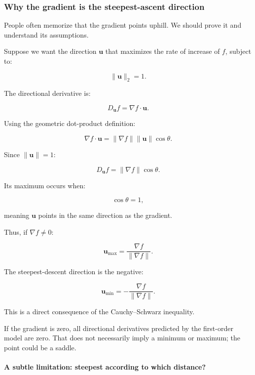 \subsubsection{Why the gradient is the steepest-ascent direction}\label{02-foundations-ii-ch021-why-the-gradient-is-the-steepest-ascent-direction}

\hypertarget{02-foundations-ii-ch021-why-the-gradient-is-the-steepest-ascent-direction}{}

People often memorize that the gradient points uphill. We should prove it and understand its assumptions.

Suppose we want the direction \(\mathbf u\) that maximizes the rate of increase of \(f\), subject to:

\[
\|\mathbf u\|_2=1.
\]

The directional derivative is:

\[
D_{\mathbf u}f=\nabla f\cdot\mathbf u.
\]

Using the geometric dot-product definition:

\[
\nabla f\cdot\mathbf u = \|\nabla f\|\|\mathbf u\|\cos\theta.
\]

Since \(\|\mathbf u\|=1\):

\[
D_{\mathbf u}f = \|\nabla f\|\cos\theta.
\]

Its maximum occurs when:

\[
\cos\theta=1,
\]

meaning \(\mathbf u\) points in the same direction as the gradient.

Thus, if \(\nabla f\ne0\):

\[
\boxed{ \mathbf u_{\max}= \frac{\nabla f}{\|\nabla f\|} }.
\]

The steepest-descent direction is the negative:

\[
\boxed{ \mathbf u_{\min}= -\frac{\nabla f}{\|\nabla f\|} }.
\]

This is a direct consequence of the Cauchy--Schwarz inequality.

If the gradient is zero, all directional derivatives predicted by the first-order model are zero. That does not necessarily imply a minimum or maximum; the point could be a saddle.

\paragraph{A subtle limitation: steepest according to which distance?}\label{02-foundations-ii-ch021-a-subtle-limitation-steepest-according-to-which-distance}

